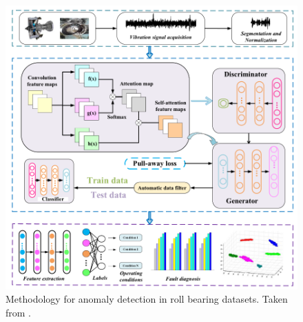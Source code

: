     

\begin{figure}[]
\centering
\includegraphics[scale=0.4]{figures/liu.etal_2022.png}
\caption[Roll bearing anomaly methodology]{Methodology for anomaly detection in roll bearing datasets. Taken from \cite{liu.etal_DataSynthesisUsing_2022}.}
\label{fig:liu.etal_2022}
\end{figure}

